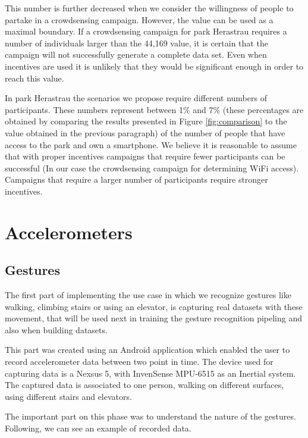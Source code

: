This number is further decreased when we consider the willingness of people to partake in a crowdsensing campaign. However, the value can be used as a maximal boundary. If a crowdsensing campaign for park Herastrau requires a number of individuals larger than the 44,169 value, it is certain that the campaign will not successfully generate a complete data set. Even when incentives are used it is unlikely that they would be significant enough in order to reach this value.

In park Herastrau the scenarios we propose require different numbers of participants. These numbers represent between 1\% and 7\% (these percentages are obtained by comparing the results presented in Figure \ref{fig:comparison} to the value obtained in the previous paragraph) of the number of people that have access to the park and own a smartphone. We believe it is reasonable to assume that with proper incentives campaigns that require fewer participants can be successful (In our case the crowdsensing campaign for determining WiFi access). Campaigns that require a larger number of participants require stronger incentives.

\section{Accelerometers}
\label{sec:res-acc}

\subsection{Gestures}
The first part of implementing the use case in which we recognize gestures like walking, climbing stairs or using an elevator, is capturing real datasets with these movement, that will be used next in training the gesture recognition pipeling and also when building datasets.

This part was created using an Android application which enabled the user to record accelerometer data between two point in time. The device used for capturing data is a Nexsus 5, with InvenSense MPU-6515 as an Inertial system. The captured data is associated to one person, walking on different surfaces, using different stairs and elevators.

The important part on this phase was to understand the nature of the gestures. Following, we can see an example of recorded data.

